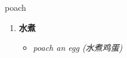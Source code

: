 
\begin{frame}
{\huge poach}
\begin{center}
\begin{enumerate}\Large
  \item \textbf{水煮}
  \begin{itemize}
    \item \em{\Large{poach an egg (水煮鸡蛋)}}
  \end{itemize}
\end{enumerate}
\end{center}
\end{frame}
